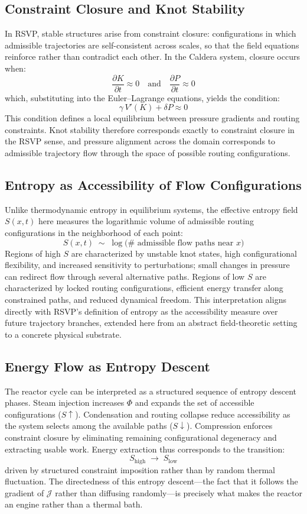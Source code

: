 \documentclass[12pt, a4paper]{article}
\begin{document}
\subsection{Constraint Closure and Knot Stability}

In RSVP, stable structures arise from constraint closure: configurations in which admissible trajectories are self-consistent across scales, so that the field equations reinforce rather than contradict each other. In the Caldera system, closure occurs when:
\[
\frac{\partial K}{\partial t} \approx 0
\quad\text{and}\quad
\frac{\partial P}{\partial t} \approx 0
\]
which, substituting into the Euler--Lagrange equations, yields the condition:
\[
\gamma\, V'(K) + \delta P \approx 0
\]
This condition defines a local equilibrium between pressure gradients and routing constraints. Knot stability therefore corresponds exactly to constraint closure in the RSVP sense, and pressure alignment across the domain corresponds to admissible trajectory flow through the space of possible routing configurations.

\subsection{Entropy as Accessibility of Flow Configurations}

Unlike thermodynamic entropy in equilibrium systems, the effective entropy field $S(x,t)$ here measures the logarithmic volume of admissible routing configurations in the neighborhood of each point:
\[
S(x,t) \;\sim\; \log \bigl( \#\text{ admissible flow paths near } x \bigr)
\]
Regions of high $S$ are characterized by unstable knot states, high configurational flexibility, and increased sensitivity to perturbations; small changes in pressure can redirect flow through several alternative paths. Regions of low $S$ are characterized by locked routing configurations, efficient energy transfer along constrained paths, and reduced dynamical freedom. This interpretation aligns directly with RSVP's definition of entropy as the accessibility measure over future trajectory branches, extended here from an abstract field-theoretic setting to a concrete physical substrate.

\subsection{Energy Flow as Entropy Descent}

The reactor cycle can be interpreted as a structured sequence of entropy descent phases. Steam injection increases $\Phi$ and expands the set of accessible configurations ($S \uparrow$). Condensation and routing collapse reduce accessibility as the system selects among the available paths ($S \downarrow$). Compression enforces constraint closure by eliminating remaining configurational degeneracy and extracting usable work. Energy extraction thus corresponds to the transition:
\[
S_{\text{high}} \;\rightarrow\; S_{\text{low}}
\]
driven by structured constraint imposition rather than by random thermal fluctuation. The directedness of this entropy descent—the fact that it follows the gradient of $\mathcal{J}$ rather than diffusing randomly—is precisely what makes the reactor an engine rather than a thermal bath.
\end{document}
